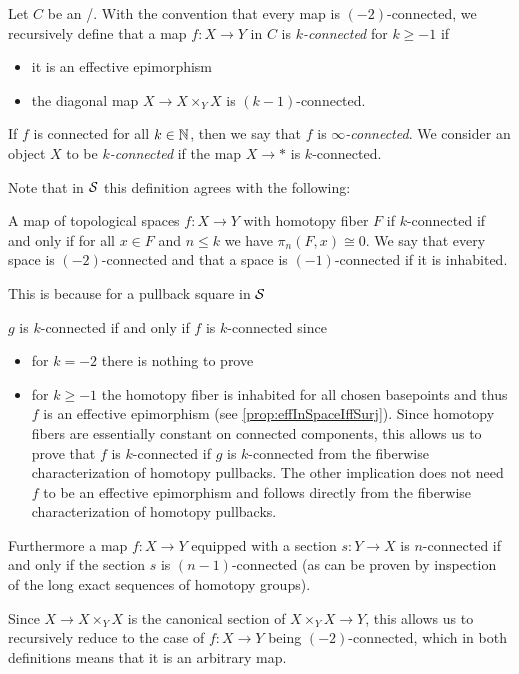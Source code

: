 \begin{definition}
    Let $C$ be an \inftytop/.
    With the convention that every map is $(-2)$-connected, we recursively define that a map $f\colon X\to Y$ in $C$ is \emph{$k$-connected} for $k\geq -1$ if
    \begin{itemize}
        \item it is an effective epimorphism
        \item the diagonal map $X\to X\times_YX$ is $(k-1)$-connected.
    \end{itemize} 
    If $f$ is connected for all $k\in\mathbb{N}$, then we say that $f$ is \emph{$\infty$-connected}.
    We consider an object $X$ to be \emph{$k$-connected} if the map $X\to *$ is $k$-connected.
\end{definition}
\begin{remark}
    Note that in $\mathcal{S}$ this definition agrees with the following:
    \begin{definition*}
        A map of topological spaces $f\colon X\to Y$ with homotopy fiber $F$ if $k$-connected if and only if for all $x\in F$ and $n\leq k$ we have $\pi_n(F,x)\cong 0$.
        We say that every space is $(-2)$-connected and that a space is $(-1)$-connected if it is inhabited.
    \end{definition*}
    This is because for a pullback square in $\mathcal{S}$ 
    \begin{center}
    \end{center}
    $g$ is $k$-connected if and only if $f$ is $k$-connected since
    \begin{itemize}
        \item for $k=-2$ there is nothing to prove
        \item for $k\geq -1$ the homotopy fiber is inhabited for all chosen basepoints and thus $f$ is an effective epimorphism (see \cref{prop:effInSpaceIffSurj}).
            Since homotopy fibers are essentially constant on connected components, this allows us to prove that $f$ is $k$-connected if $g$ is $k$-connected from the fiberwise characterization of homotopy pullbacks. %
            The other implication does not need $f$ to be an effective epimorphism and follows directly from the fiberwise characterization of homotopy pullbacks. 
    \end{itemize}
    
    Furthermore a map $f\colon X\to Y$ equipped with a section $s\colon Y\to X$ is $n$-connected if and only if the section $s$ is $(n-1)$-connected (as can be proven by inspection of the long exact sequences of homotopy groups).
    
    Since $X\to X\times_YX$ is the canonical section of $X\times_{Y} X\to Y$, this allows us to recursively reduce to the case of $f\colon X\to Y$ being $(-2)$-connected, which in both definitions means that it is an arbitrary map.
\end{remark}
